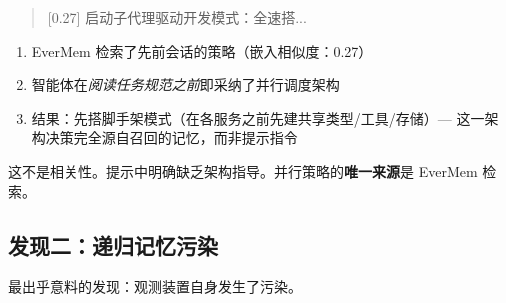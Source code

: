 \documentclass[11pt, a4paper]{article}
\begin{document}
\begin{quote}
\ttfamily\small\color{deep}
[0.27] 启动子代理驱动开发模式：全速搭...
\end{quote}

\begin{keyfinding}[因果链：记忆 $\to$ 策略 $\to$ 架构]
\begin{enumerate}
  \item EverMem 检索了先前会话的策略（嵌入相似度：0.27）
  \item 智能体在\emph{阅读任务规范之前}即采纳了并行调度架构
  \item 结果：先搭脚手架模式（在各服务之前先建共享类型/工具/存储）--- 这一架构决策完全源自召回的记忆，而非提示指令
\end{enumerate}
这不是相关性。提示中明确缺乏架构指导。并行策略的\textbf{唯一来源}是 EverMem 检索。
\end{keyfinding}

\subsection{发现二：递归记忆污染}

最出乎意料的发现：观测装置自身发生了污染。
\end{document}
